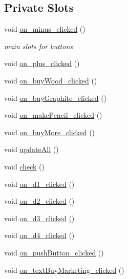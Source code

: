 \subsection*{Private Slots}
\begin{DoxyCompactItemize}
\item 
void \mbox{\hyperlink{classPencilProducer_a4463cb3676d728734fb935c8ea6fcb14}{on\+\_\+minus\+\_\+clicked}} ()
\begin{DoxyCompactList}\small\item\em main slots for buttons \end{DoxyCompactList}\item 
void \mbox{\hyperlink{classPencilProducer_a4f25cb44f7656627fb2118db163c6294}{on\+\_\+plus\+\_\+clicked}} ()
\item 
void \mbox{\hyperlink{classPencilProducer_a349d36fe7bfb716010b7ee0172e2ba88}{on\+\_\+buy\+Wood\+\_\+clicked}} ()
\item 
void \mbox{\hyperlink{classPencilProducer_aa6d6a98ad6b815634efbbf263605824e}{on\+\_\+buy\+Graphite\+\_\+clicked}} ()
\item 
void \mbox{\hyperlink{classPencilProducer_a9a278b633e203bc16941093ca1727c85}{on\+\_\+make\+Pencil\+\_\+clicked}} ()
\item 
void \mbox{\hyperlink{classPencilProducer_a2d54ee1f50fa095221bde3adf0d71d95}{on\+\_\+buy\+More\+\_\+clicked}} ()
\item 
void \mbox{\hyperlink{classPencilProducer_af182bfe6656f6e068da6feb74afa0bec}{update\+All}} ()
\item 
void \mbox{\hyperlink{classPencilProducer_aa580bdf7aaf3a94639367011d696a4ee}{check}} ()
\item 
void \mbox{\hyperlink{classPencilProducer_abff5d78a2e88f078fb136232521beb8d}{on\+\_\+d1\+\_\+clicked}} ()
\item 
void \mbox{\hyperlink{classPencilProducer_a0dd6a7d3b2a36b681bc7b89f4d7873f0}{on\+\_\+d2\+\_\+clicked}} ()
\item 
void \mbox{\hyperlink{classPencilProducer_af20103b9e939ee403171d12d94dd4496}{on\+\_\+d3\+\_\+clicked}} ()
\item 
void \mbox{\hyperlink{classPencilProducer_a63b3e504b72d24f7a388f2e401d7bcfa}{on\+\_\+d4\+\_\+clicked}} ()
\item 
void \mbox{\hyperlink{classPencilProducer_a3b01bf3f86e1e813ebd067ccae4066e3}{on\+\_\+push\+Button\+\_\+clicked}} ()
\item 
void \mbox{\hyperlink{classPencilProducer_afbc14a860bb92111effc14c5406c1fe8}{on\+\_\+text\+Buy\+Marketing\+\_\+clicked}} ()

\end{DoxyCompactItemize}

